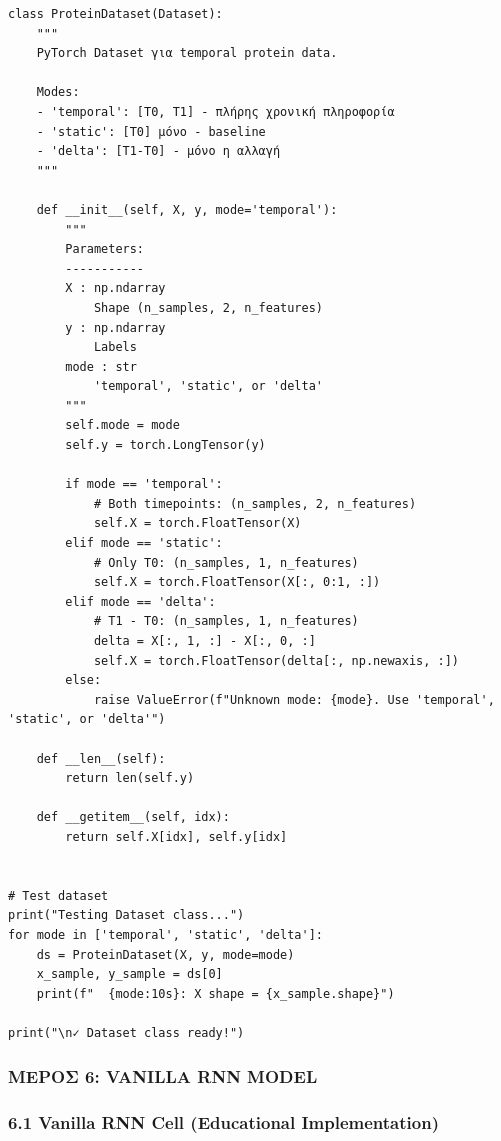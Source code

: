 \begin{lstlisting}
class ProteinDataset(Dataset):
    """
    PyTorch Dataset για temporal protein data.
 
    Modes:
    - 'temporal': [T0, T1] - πλήρης χρονική πληροφορία
    - 'static': [T0] μόνο - baseline
    - 'delta': [T1-T0] - μόνο η αλλαγή
    """
 
    def __init__(self, X, y, mode='temporal'):
        """
        Parameters:
        -----------
        X : np.ndarray
            Shape (n_samples, 2, n_features)
        y : np.ndarray
            Labels
        mode : str
            'temporal', 'static', or 'delta'
        """
        self.mode = mode
        self.y = torch.LongTensor(y)
 
        if mode == 'temporal':
            # Both timepoints: (n_samples, 2, n_features)
            self.X = torch.FloatTensor(X)
        elif mode == 'static':
            # Only T0: (n_samples, 1, n_features)
            self.X = torch.FloatTensor(X[:, 0:1, :])
        elif mode == 'delta':
            # T1 - T0: (n_samples, 1, n_features)
            delta = X[:, 1, :] - X[:, 0, :]
            self.X = torch.FloatTensor(delta[:, np.newaxis, :])
        else:
            raise ValueError(f"Unknown mode: {mode}. Use 'temporal', 'static', or 'delta'")
 
    def __len__(self):
        return len(self.y)
 
    def __getitem__(self, idx):
        return self.X[idx], self.y[idx]
 
 
# Test dataset
print("Testing Dataset class...")
for mode in ['temporal', 'static', 'delta']:
    ds = ProteinDataset(X, y, mode=mode)
    x_sample, y_sample = ds[0]
    print(f"  {mode:10s}: X shape = {x_sample.shape}")
 
print("\n✓ Dataset class ready!")
\end{lstlisting}
 
\subsubsection*{ΜΕΡΟΣ 6: VANILLA RNN MODEL}
 
\subsubsection*{6.1 Vanilla RNN Cell (Educational Implementation)}
 
